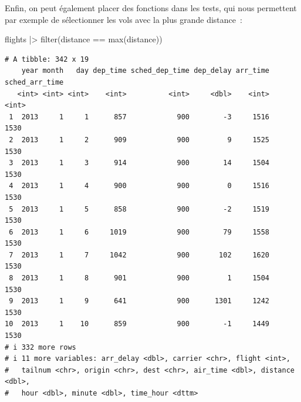 \documentclass[
  letterpaper,
  DIV=11,
  numbers=noendperiod,
  oneside]{scrreprt}
\newenvironment{Shaded}{\begin{snugshade}}{\end{snugshade}}
\newcommand{\FunctionTok}[1]{\textcolor[rgb]{0.28,0.35,0.67}{#1}}
\newcommand{\NormalTok}[1]{\textcolor[rgb]{0.00,0.23,0.31}{#1}}
\newcommand{\SpecialCharTok}[1]{\textcolor[rgb]{0.37,0.37,0.37}{#1}}
\begin{document}
Enfin, on peut également placer des fonctions dans les tests, qui nous
permettent par exemple de sélectionner les vols avec la plus grande
distance~:

\begin{Shaded}
\begin{Highlighting}[]
\NormalTok{flights }\SpecialCharTok{|\textgreater{}} 
  \FunctionTok{filter}\NormalTok{(distance }\SpecialCharTok{==} \FunctionTok{max}\NormalTok{(distance))}
\end{Highlighting}
\end{Shaded}

\begin{verbatim}
# A tibble: 342 x 19
    year month   day dep_time sched_dep_time dep_delay arr_time sched_arr_time
   <int> <int> <int>    <int>          <int>     <dbl>    <int>          <int>
 1  2013     1     1      857            900        -3     1516           1530
 2  2013     1     2      909            900         9     1525           1530
 3  2013     1     3      914            900        14     1504           1530
 4  2013     1     4      900            900         0     1516           1530
 5  2013     1     5      858            900        -2     1519           1530
 6  2013     1     6     1019            900        79     1558           1530
 7  2013     1     7     1042            900       102     1620           1530
 8  2013     1     8      901            900         1     1504           1530
 9  2013     1     9      641            900      1301     1242           1530
10  2013     1    10      859            900        -1     1449           1530
# i 332 more rows
# i 11 more variables: arr_delay <dbl>, carrier <chr>, flight <int>,
#   tailnum <chr>, origin <chr>, dest <chr>, air_time <dbl>, distance <dbl>,
#   hour <dbl>, minute <dbl>, time_hour <dttm>
\end{verbatim}
\end{document}
